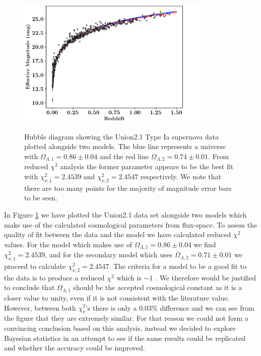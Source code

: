 \documentclass[twocolumn]{revtex4}
\begin{document}
{\begin{figure}[!h]
\begin{center}
\includegraphics[width=9.25cm]{results/hubble_diagram}
\vspace{-3ex}
\caption[]{Hubble diagram showing the Union2.1 Type Ia supernova data plotted alongside two models. The blue line represents a universe with $\Omega_{\Lambda,1}=0.86\pm0.04$ and the red line $\Omega_{\Lambda,2}=0.74\pm0.01$. From reduced $\chi^2$ analysis the former parameter appears to be the best fit with $\chi^2_{\nu,1}=2.4539$ and $\chi^2_{\nu,2}=2.4547$ respectively. We note that there are too many points for the majority of magnitude error bars to be seen.}
\vspace{-3ex}
\label{fig:hubble_diagram}
\end{center}
\end{figure}

In Figure \ref{fig:hubble_diagram} we have plotted the Union2.1 data set alongside two models which make use of the calculated cosmological parameters from flux-space. To assess the quality of fit between the data and the model we have calculated reduced $\chi^2$ values. For the model which makes use of $\Omega_{\Lambda,1}=0.86\pm0.04$ we find $\chi^2_{\nu,1}=2.4539$, and for the secondary model which uses $\Omega_{\Lambda,2}=0.71\pm0.01$ we proceed to calculate $\chi^2_{\nu,2}=2.4547$. The criteria for a model to be a good fit to the data is to produce a reduced $\chi^2$ which is $\sim1$ \cite{hugheshase}. We therefore would be justified to conclude that $\Omega_{\Lambda,1}$ should be the accepted cosmological constant as it is a closer value to unity, even if it is not consistent with the literature value.  However, between both $\chi^2_\nu$'s there is only a $0.03\%$ difference and we can see from the figure that they are extremely similar. For that reason we could not form a convincing conclusion based on this analysis, instead we decided to explore Bayesian statistics in an attempt to see if the same results could be replicated and whether the accuracy could be improved.

}
\end{document}
